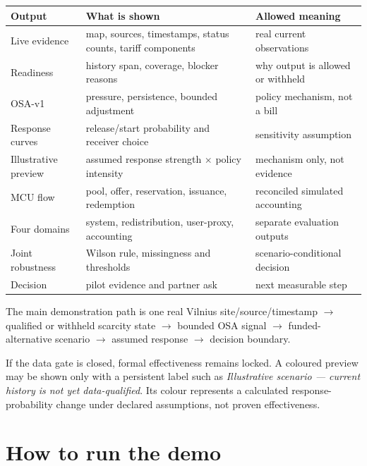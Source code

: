 \documentclass[11pt,a4paper]{article}
\begin{document}
\begin{longtable}{p{4.0cm}p{7.3cm}p{4.4cm}}
\toprule Output & What is shown & Allowed meaning \\\midrule\endhead
Live evidence & map, sources, timestamps, status counts, tariff components & real current observations \\
Readiness & history span, coverage, blocker reasons & why output is allowed or withheld \\
OSA-v1 & pressure, persistence, bounded adjustment & policy mechanism, not a bill \\
Response curves & release/start probability and receiver choice & sensitivity assumption \\
Illustrative preview & assumed response strength $\times$ policy intensity & mechanism only, not evidence \\
MCU flow & pool, offer, reservation, issuance, redemption & reconciled simulated accounting \\
Four domains & system, redistribution, user-proxy, accounting & separate evaluation outputs \\
Joint robustness & Wilson rule, missingness and thresholds & scenario-conditional decision \\
Decision & pilot evidence and partner ask & next measurable step \\
\bottomrule
\end{longtable}

The main demonstration path is one real Vilnius site/source/timestamp $\to$ qualified or withheld scarcity state $\to$ bounded OSA signal $\to$ funded-alternative scenario $\to$ assumed response $\to$ decision boundary.

If the data gate is closed, formal effectiveness remains locked. A coloured preview may be shown only with a persistent label such as \emph{Illustrative scenario --- current history is not yet data-qualified}. Its colour represents a calculated response-probability change under declared assumptions, not proven effectiveness.

\section{How to run the demo}
\end{document}
